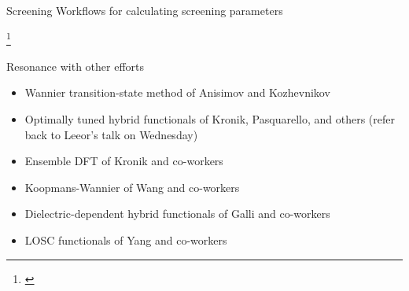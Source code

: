 \documentclass[xcolor=table,aspectratio=169]{beamer}
\newcommand\blfootcite[1]{%
  \begingroup
  \renewcommand\thefootnote{}\footnote{\hspace{-4ex}\cite{#1}}%
  \addtocounter{footnote}{-1}%
  \endgroup
}
\numberwithin{equation}{section}
\begin{document}
\begin{frame}{Screening}
   \small Workflows for calculating screening parameters

   \vspace{1ex}


   \vspace{-1.5ex}

    \blfootcite{DeGennaro2022,Colonna2022,Schubert2022}


\end{frame}

\begin{frame}{Resonance with other efforts}
   \begin{itemize}
      \item Wannier transition-state method of Anisimov and Kozhevnikov \cite{Anisimov2005}
      \item Optimally tuned hybrid functionals of Kronik, Pasquarello, and others (refer back to Leeor's talk on Wednesday) \cite{Kronik2012,Wing2021}
      \item Ensemble DFT of Kronik and co-workers \cite{Kraisler2013}
      \item Koopmans-Wannier of Wang and co-workers \cite{Ma2016}
      \item Dielectric-dependent hybrid functionals of Galli and co-workers \cite{Skone2016a}
      \item LOSC functionals of Yang and co-workers \cite{Li2018}
   \end{itemize}
\end{frame}
\end{document}
